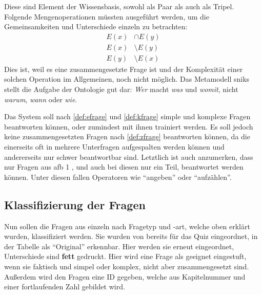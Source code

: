 Diese sind Element der Wissensbasis, sowohl als Paar als auch als Tripel.
Folgende Mengenoperationen müssten ausgeführt werden, um die Gemeinsamkeiten und Unterschiede einzeln zu betrachten:
\begin{align*}
E(x) &\cap E(y) \\
E(x) &\setminus E(y) \\
E(y) &\setminus E(x)
\end{align*}
Dies ist, weil es eine zusammengesetzte Frage ist und der Komplexität einer solchen Operation im Allgemeinen, noch nicht möglich.
Das Metamodell \ac{snik}s stellt die Aufgabe der Ontologie gut dar: \emph{Wer} macht \emph{was} und \emph{womit}, nicht \emph{warum}, \emph{wann} oder \emph{wie}.

Das System soll nach \cref{def:efrage} und \cref{def:kfrage} simple und komplexe Fragen beantworten können, oder zumindest mit ihnen trainiert werden.
Es soll jedoch keine zusammengesetzten Fragen nach \cref{def:zfrage} beantworten können, da die einerseits oft in mehrere Unterfragen aufgespalten werden können
und andererseits nur schwer beantwortbar sind.
Letztlich ist auch anzumerken, dass nur Fragen aus \ac{afb} 1 \citep{afb}, und auch bei diesen nur ein Teil, beantwortet werden können.
Unter diesen fallen Operatoren wie \enquote{angeben} oder \enquote{aufzählen}.

\subsection{Klassifizierung der Fragen}\label{sub:fragenklassifikation}

Nun sollen die Fragen aus \citet{bb} einzeln nach Fragetyp und -art, welche oben erklärt wurden, klassifiziert werden.
Sie wurden von \citet{arneba} bereits für das Quiz eingeordnet, in der Tabelle als \enquote{Original} erkennbar.
Hier werden sie erneut eingeordnet, Unterschiede sind \textbf{fett} gedruckt.
Hier wird eine Frage als geeignet eingestuft, wenn sie faktisch und simpel oder komplex, nicht aber zusammengesetzt sind.
Außerdem wird den Fragen eine ID gegeben, welche aus Kapitelnummer und einer fortlaufenden Zahl gebildet wird.

